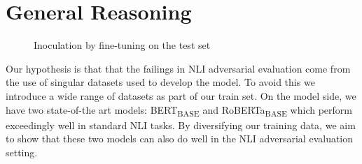 \section{General Reasoning}
\label{sec:reasoning}


\begin{figure}
	\centering
	\caption{Inoculation by fine-tuning on the test set}
	\label{fig:inoculation}
\end{figure}

Our hypothesis is that that the failings in NLI adversarial evaluation come from the use of singular datasets used to develop the model. To avoid this we introduce a wide range of datasets as part of our train set.  On the model side, we have two state-of-the art models: BERT\textsubscript{BASE} and RoBERTa\textsubscript{BASE} which perform exceedingly well in standard NLI tasks. By diversifying our training data, we aim to show that these two models can also do well in the NLI adversarial evaluation setting.